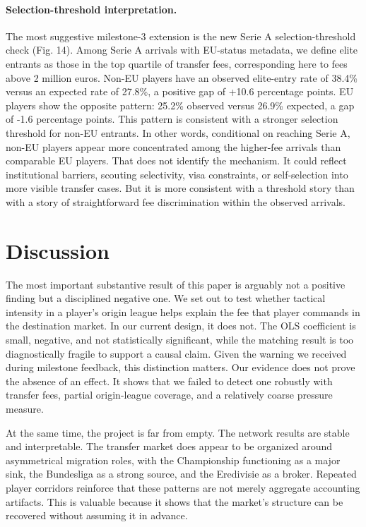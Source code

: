 \documentclass[12pt]{article}
\begin{document}
\paragraph*{Selection-threshold interpretation.} The most suggestive milestone-3 extension is the new Serie A selection-threshold check (Fig. 14). Among Serie A arrivals with EU-status metadata, we define elite entrants as those in the top quartile of transfer fees, corresponding here to fees above 2 million euros. Non-EU players have an observed elite-entry rate of 38.4\% versus an expected rate of 27.8\%, a positive gap of +10.6 percentage points. EU players show the opposite pattern: 25.2\% observed versus 26.9\% expected, a gap of -1.6 percentage points. This pattern is consistent with a stronger selection threshold for non-EU entrants. In other words, conditional on reaching Serie A, non-EU players appear more concentrated among the higher-fee arrivals than comparable EU players. That does not identify the mechanism. It could reflect institutional barriers, scouting selectivity, visa constraints, or self-selection into more visible transfer cases. But it is more consistent with a threshold story than with a story of straightforward fee discrimination within the observed arrivals.

\section*{Discussion}

The most important substantive result of this paper is arguably not a positive finding but a disciplined negative one. We set out to test whether tactical intensity in a player's origin league helps explain the fee that player commands in the destination market. In our current design, it does not. The OLS coefficient is small, negative, and not statistically significant, while the matching result is too diagnostically fragile to support a causal claim. Given the warning we received during milestone feedback, this distinction matters. Our evidence does not prove the absence of an effect. It shows that we failed to detect one robustly with transfer fees, partial origin-league coverage, and a relatively coarse pressure measure.

At the same time, the project is far from empty. The network results are stable and interpretable. The transfer market does appear to be organized around asymmetrical migration roles, with the Championship functioning as a major sink, the Bundesliga as a strong source, and the Eredivisie as a broker. Repeated player corridors reinforce that these patterns are not merely aggregate accounting artifacts. This is valuable because it shows that the market's structure can be recovered without assuming it in advance.
\end{document}
